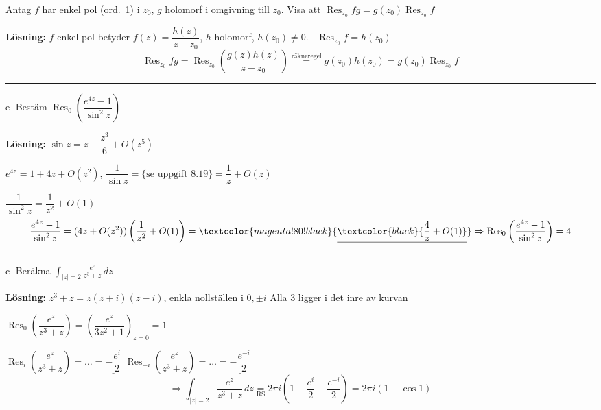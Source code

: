  \quad Antag $f$ har enkel pol (ord.\ 1) i $z_0$, $g$ holomorf i omgivning till $z_0$. Visa att $\operatorname{Res}_{z_0} fg = g(z_0) \operatorname{Res}_{z_0} f$

\textbf{Lösning:} $f$ enkel pol betyder $f(z) = \dfrac{h(z)}{z - z_0}$, $h$ holomorf, $h(z_0) \neq 0$. \ $\operatorname{Res}_{z_0} f = h(z_0)$
\[ \operatorname{Res}_{z_0} fg = \operatorname{Res}_{z_0}\left( \frac{g(z)h(z)}{z - z_0} \right) \overset{\text{räkneregel}}{=} g(z_0)h(z_0) = g(z_0) \operatorname{Res}_{z_0} f \]

\noindent\rule{\linewidth}{0.4pt}

 \quad \textcircled{e} Bestäm $\operatorname{Res}_0\left( \dfrac{e^{4z} - 1}{\sin^2 z} \right)$

\textbf{Lösning:} $\sin z = z - \dfrac{z^3}{6} + O(z^5)$

$e^{4z} = 1 + 4z + O(z^2)$, \quad $\dfrac{1}{\sin z} = \{\text{se uppgift 8.19}\} = \dfrac{1}{z} + O(z)$

$\dfrac{1}{\sin^2 z} = \dfrac{1}{z^2} + O(1)$
\[ \frac{e^{4z} - 1}{\sin^2 z} = (4z + O(z^2))\left( \frac{1}{z^2} + O(1) \right) = \textcolor{magenta!80!black}{\underline{\textcolor{black}{\frac{4}{z} + O(1)}}} \Rightarrow \operatorname{Res}_0\left( \frac{e^{4z} - 1}{\sin^2 z} \right) = 4 \]

\noindent\rule{\linewidth}{0.4pt}

 \quad \textcircled{c} Beräkna $\displaystyle\int_{|z| = 2} \frac{e^z}{z^3 + z}\,dz$

\textbf{Lösning:} $z^3 + z = z(z + i)(z - i)$, enkla nollställen i $0, \pm i$
Alla 3 ligger i det inre av kurvan

$\operatorname{Res}_0\left( \dfrac{e^z}{z^3 + z} \right) = \left( \dfrac{e^z}{3z^2 + 1} \right)_{z = 0} = \underline{1}$

$\operatorname{Res}_i\left( \dfrac{e^z}{z^3 + z} \right) = \dots = \underline{-\dfrac{e^i}{2}}$ \qquad $\operatorname{Res}_{-i}\left( \dfrac{e^z}{z^3 + z} \right) = \dots = \underline{-\dfrac{e^{-i}}{2}}$
\[ \Rightarrow \int_{|z| = 2} \frac{e^z}{z^3 + z}\,dz \underset{\text{RS}}{=} 2\pi i\left( 1 - \frac{e^i}{2} - \frac{e^{-i}}{2} \right) = 2\pi i(1 - \cos 1) \]
